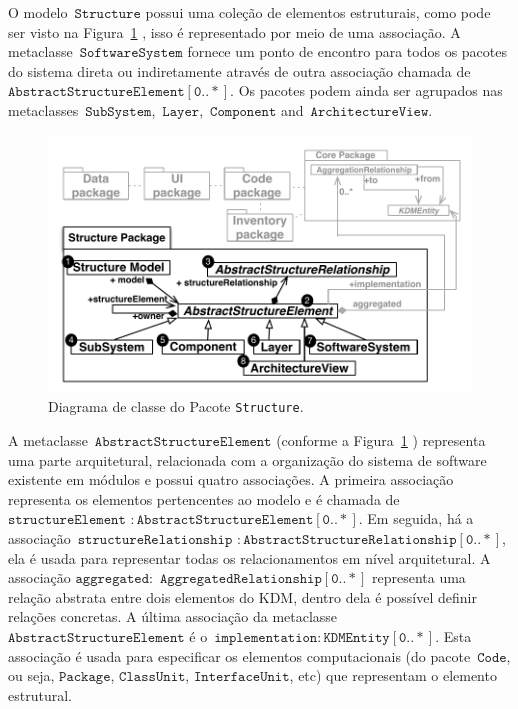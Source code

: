 \documentclass[12pt]{article}
\begin{document}
O modelo~$\mathtt{Structure}$ possui uma coleção de elementos estruturais, como pode ser visto na Figura~\ref{fig:structureModel} , isso é representado por meio de uma associação. A metaclasse~$\mathtt{SoftwareSystem}$ fornece um ponto de encontro para todos os pacotes do sistema direta ou indiretamente através de outra associação chamada de~$\mathtt{AbstractStructureElement[0..*]}$. Os pacotes podem ainda ser agrupados nas metaclasses~$\mathtt{SubSystem}$,~$\mathtt{Layer}$,~$\mathtt{Component}$ and~$\mathtt{ArchitectureView}$.


\begin{figure}[h]
 \centering
 \includegraphics[scale=0.8]{StructurePackageFigure.pdf}
 \caption{Diagrama de classe do Pacote \texttt{Structure}.}
 \label{fig:structureModel}
\end{figure}

A metaclasse~$\mathtt{AbstractStructureElement}$ (conforme a Figura~\ref{fig:structureModel} ) representa uma parte arquitetural, relacionada com a organização do sistema de software existente em módulos e possui quatro associações. A primeira associação representa os elementos pertencentes ao modelo e é chamada de $\mathtt{structureElement}$ $\mathtt{:AbstractStructureElement[0..*]}$. Em seguida, há a associação~$\mathtt{structureRelationship}$ $\mathtt{:AbstractStructureRelationship[0..*]}$, ela é usada para representar todas os relacionamentos em nível arquitetural. A associação $\mathtt{aggregated:}$ $\mathtt{AggregatedRelationship[0..*]}$ representa uma relação abstrata entre dois elementos do KDM, dentro dela é possível definir relações concretas. A última associação da metaclasse~$\mathtt{AbstractStructureElement}$ é o~$\mathtt{implementation:KDMEntity[0..*]}$. Esta associação é usada para especificar os elementos computacionais (do pacote~$\mathtt{Code}$, ou seja, $\mathtt{Package}$, $\mathtt{ClassUnit}$, $\mathtt{InterfaceUnit}$, etc) que representam o elemento estrutural. 
\end{document}
